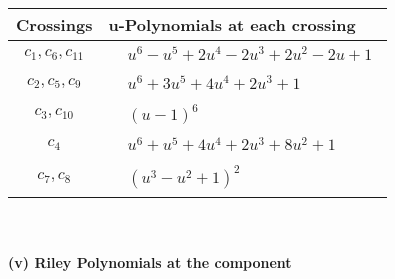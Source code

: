 \documentclass[1p]{elsarticle_modified}
\theoremstyle{definition}
\begin{document}
\begin{tabular}{m{50pt}|m{274pt}}
Crossings & \hspace{64pt}u-Polynomials at each crossing \\
\hline $$\begin{aligned}c_{1},c_{6},c_{11}\end{aligned}$$&$\begin{aligned}
&u^6- u^5+2 u^4-2 u^3+2 u^2-2 u+1
\end{aligned}$\\
\hline $$\begin{aligned}c_{2},c_{5},c_{9}\end{aligned}$$&$\begin{aligned}
&u^6+3 u^5+4 u^4+2 u^3+1
\end{aligned}$\\
\hline $$\begin{aligned}c_{3},c_{10}\end{aligned}$$&$\begin{aligned}
&(u-1)^6
\end{aligned}$\\
\hline $$\begin{aligned}c_{4}\end{aligned}$$&$\begin{aligned}
&u^6+u^5+4 u^4+2 u^3+8 u^2+1
\end{aligned}$\\
\hline $$\begin{aligned}c_{7},c_{8}\end{aligned}$$&$\begin{aligned}
&(u^3- u^2+1)^2
\end{aligned}$\\
\hline
\end{tabular}\\~\\
\newpage\renewcommand{\arraystretch}{1}
\flushleft \textbf{(v) Riley Polynomials at the component}\newline \\
\end{document}
